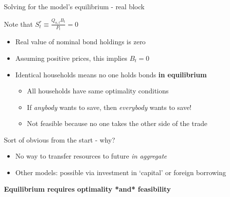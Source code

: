 %
%
%
%



\begin{frame}{Solving for the model's equilibrium - real block}

Note that $S^{r}_{t} \equiv \frac{Q_{n,t}B_{t}}{P_{t}}=0$
\begin{itemize}
\item	Real value of nominal bond holdings is zero
\item	Assuming positive prices, this implies $B_{t}=0$
\item	Identical households means no one holds bonds \textbf{in equilibrium}
	\begin{itemize}
	\item	All households have same optimality conditions
	\item	If \emph{anybody} wants to save, then \emph{everybody} wants to save!
	\item	Not feasible because no one takes the other side of the trade
	\end{itemize}
\end{itemize}

\vspace{2mm}
Sort of obvious from the start - why?
\begin{itemize}
\item	No way to transfer resources to future \emph{in aggregate}
\item	Other models: possible via investment in `capital' or foreign borrowing
\end{itemize}

\vspace{2mm}
\textbf{Equilibrium requires optimality *and* feasibility}

\end{frame}

